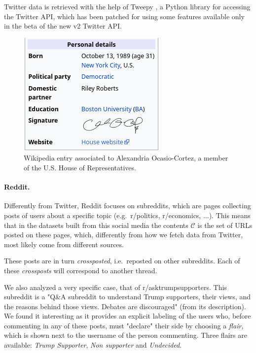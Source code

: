 Twitter data is retrieved with the help of Tweepy \cite{tweepy}, a Python
library for accessing the Twitter API, which has been patched for using some
features available only in the beta of the new v2 Twitter API.


\begin{figure}
	\centering
	\includegraphics[width=0.4\linewidth]{tex/img/wikipedia-elected.png}
	\caption[Example Wikipedia entry]{Wikipedia entry associated to Alexandria Ocasio-Cortez, a member
		of the U.S. House of Representatives.}%
	\label{fig:tex/img/wikipedia-elected}
\end{figure}

\paragraph{Reddit.}%
\label{par:reddit}

Differently from Twitter, Reddit focuses on subreddits, which are pages
collecting posts of users about a specific topic (e.g.\ r/politics,
r/economics, $\dots$). This means that
in the datasets built from this social media the contents $\mathcal{C} $ is the
set of URLs posted on these pages, which, differently from how we fetch data
from Twitter, most likely
come from different sources.

These posts are in turn \emph{crossposted}, i.e.\ reposted on other subreddits. Each of
these \emph{crossposts} will correspond to another thread.

We also analyzed a
very specific case, that of r/asktrumpsupporters. This subreddit is a "Q\&A
subreddit to understand Trump supporters, their views, and the reasons behind
those views. Debates are discouraged" (from its description). We found it interesting as it provides an explicit labeling of the
users who, before commenting in any of these posts, must "declare" their side
by choosing a \emph{flair}, which is shown next to the username of the person
commenting.  Three flairs are available: \emph{Trump Supporter}, \emph{Non
	supporter} and \emph{Undecided}.

